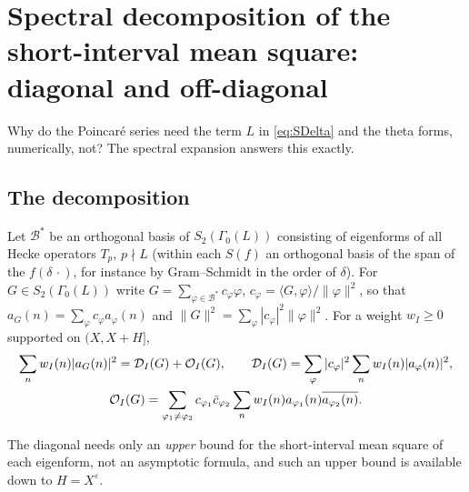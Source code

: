 \documentclass[11pt]{amsart}
\theoremstyle{remark}
\newcommand{\cB}{\mathcal{B}}
\newcommand{\e}{\varepsilon}
\begin{document}
\section{Spectral decomposition of the short-interval mean square: diagonal and off-diagonal}\label{sec:spectral}

Why do the Poincar\'e series need the term $L$ in \eqref{eq:SDelta} and the theta forms, numerically, not? The spectral expansion answers this exactly.

\subsection{The decomposition}
Let $\cB^*$ be an orthogonal basis of $S_2(\Gamma_0(L))$ consisting of eigenforms of all Hecke operators $T_p$, $p\nmid L$ (within each $S(f)$ an orthogonal basis of the span of the $f(\delta\,\cdot)$, for instance by Gram--Schmidt in the order of $\delta$). For $G\in S_2(\Gamma_0(L))$ write $G=\sum_{\varphi\in\cB^*}c_\varphi\varphi$, $c_\varphi=\langle G,\varphi\rangle/\|\varphi\|^2$, so that $a_G(n)=\sum_\varphi c_\varphi a_\varphi(n)$ and $\|G\|^2=\sum_\varphi|c_\varphi|^2\|\varphi\|^2$. For a weight $w_I\ge0$ supported on $(X,X+H]$,
\begin{gather}
\sum_nw_I(n)|a_G(n)|^2=\mathcal D_I(G)+\mathcal O_I(G),\qquad
\mathcal D_I(G)=\sum_{\varphi}|c_\varphi|^2\sum_nw_I(n)|a_\varphi(n)|^2,\label{eq:specdec}\\
\mathcal O_I(G)=\sum_{\varphi_1\ne\varphi_2}c_{\varphi_1}\bar c_{\varphi_2}\sum_nw_I(n)a_{\varphi_1}(n)\overline{a_{\varphi_2}(n)} .\notag
\end{gather}

The diagonal needs only an \emph{upper} bound for the short-interval mean square of each eigenform, not an asymptotic formula, and such an upper bound is available down to $H=X^\e$.
\end{document}
